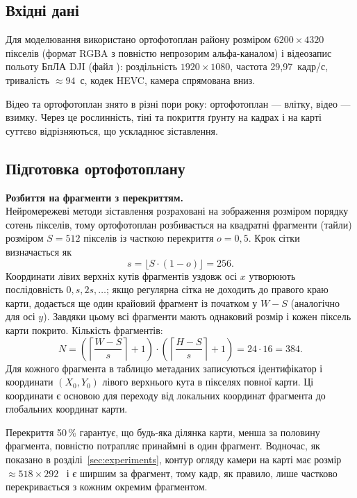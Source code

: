 \subsection{Вхідні дані}

Для моделювання використано ортофотоплан району розміром $6200 \times 4320$ пікселів (формат RGBA з повністю непрозорим альфа-каналом) і відеозапис польоту БпЛА DJI (файл ): роздільність $1920 \times 1080$, частота 29,97~кадр/с, тривалість $\approx 94$~с, кодек HEVC, камера спрямована вниз.

Відео та ортофотоплан знято в різні пори року: ортофотоплан --- влітку, відео --- взимку. Через це рослинність, тіні та покриття ґрунту на кадрах і на карті суттєво відрізняються, що ускладнює зіставлення.

\subsection{Підготовка ортофотоплану}

\textbf{Розбиття на фрагменти з перекриттям.}\\
Нейромережеві методи зіставлення розраховані на зображення розміром порядку сотень пікселів, тому ортофотоплан розбивається на квадратні фрагменти (тайли) розміром $S = 512$ пікселів із часткою перекриття $o = 0{,}5$. Крок сітки визначається як
\begin{equation}
s = \lfloor S \cdot (1 - o) \rfloor = 256 .
\end{equation}
Координати лівих верхніх кутів фрагментів уздовж осі $x$ утворюють послідовність $0, s, 2s, \dots$; якщо регулярна сітка не доходить до правого краю карти, додається ще один крайовий фрагмент із початком у $W - S$ (аналогічно для осі $y$). Завдяки цьому всі фрагменти мають однаковий розмір і кожен піксель карти покрито. Кількість фрагментів:
\begin{equation}
N = \left( \left\lceil \frac{W - S}{s} \right\rceil + 1 \right) \cdot \left( \left\lceil \frac{H - S}{s} \right\rceil + 1 \right) = 24 \cdot 16 = 384 .
\end{equation}
Для кожного фрагмента в таблицю метаданих  записуються ідентифікатор і координати $(X_0, Y_0)$ лівого верхнього кута в пікселях повної карти. Ці координати є основою для переходу від локальних координат фрагмента до глобальних координат карти.

Перекриття 50\,\% гарантує, що будь-яка ділянка карти, менша за половину фрагмента, повністю потрапляє принаймні в один фрагмент. Водночас, як показано в розділі~\ref{sec:experiments}, контур огляду камери на карті має розмір $\approx 518 \times 292$~\px{} і є ширшим за фрагмент, тому кадр, як правило, лише частково перекривається з кожним окремим фрагментом.

